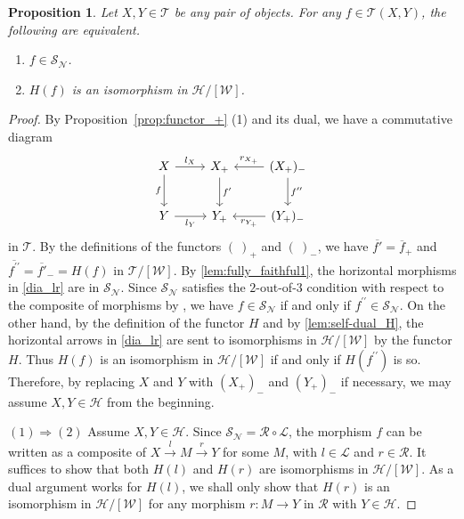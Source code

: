 \documentclass[a4paper,reqno,10pt]{amsart}
\DeclareRobustCommand{\darkblueedit}[1]{#1}
\newtheorem{proposition}[proposition]{Proposition}
\theoremstyle{definition}
\theoremstyle{definition}
\theoremstyle{definition}
\theoremstyle{definition}
\theoremstyle{plain}
\newcommand{\CH}{\mathcal{H}}
\newcommand{\CL}{\mathcal{L}}
\newcommand{\CN}{\mathcal{N}}
\newcommand{\CR}{\mathcal{R}}
\newcommand{\CT}{\mathcal{T}}
\newcommand{\CW}{\mathcal{W}}
\renewcommand{\SS}{\mathscr{S}}
\begin{document}
\begin{proposition}\label{prop:fully_faithful}
Let $X,Y\in\CT$ be any pair of objects. For any $f\in\CT(X,Y)$, the following are equivalent.
\begin{enumerate}
\item $f\in\SS_{\CN}$.
\item $H(f)$ is an isomorphism in $\CH/[\CW]$.
\end{enumerate}
\end{proposition}
\begin{proof}
By Proposition~\ref{prop:functor_+} {\rm (1)} and its dual, we have a commutative diagram
\begin{equation}\label{dia_lr}
\begin{tikzcd}[row sep=0.8cm]
X \arrow{d}[swap]{f}\arrow{r}{l_X}
&X_+ \arrow{d}{f'}
&(X_+)_- \arrow{l}[swap]{r_{X_+}}\arrow{d}{f^{\prime\prime}}
\\
Y \arrow{r}[swap]{l_Y}
&Y_+ 
&(Y_+)_- \arrow{l}{r_{Y_+}}
\end{tikzcd}
\end{equation}
in $\CT$. \darkblueedit{By the definitions of the functors} $(\ )_+$ and $(\ )_-$, we have $\overline{f'}=\overline{f}_+$ and $\overline{f^{\prime\prime}}=\overline{f'}_-=H(f)$ in $\CT/[\CW]$.
By \cref{lem:fully_faithful1}, the horizontal morphisms in \eqref{dia_lr} are in $\SS_{\CN}$.
Since $\SS_{\CN}$ satisfies the $2$-out-of-$3$ condition with respect to the composite of morphisms by \cite[Corollary~2.18]{Oga24}, we have $f\in\SS_{\CN}$ if and only if $f^{\prime\prime}\in\SS_{\CN}$.
On the other hand, by the definition of the functor $H$ and by \cref{lem:self-dual_H}, the horizontal arrows in \eqref{dia_lr} are sent to isomorphisms in $\CH/[\CW]$ by the functor $H$. Thus $H(f)$ is an isomorphism in $\CH/[\CW]$ if and only if $H(f^{\prime\prime})$ is so.
Therefore, by replacing $X$ and $Y$ with $(X_+)_-$ and $(Y_+)_-$ if necessary, we may assume $X,Y\in\CH$ from the beginning.


$(1)\Rightarrow(2)$ 
Assume $X,Y\in\CH$.
\normalcolor
Since $\SS_{\CN}=\CR\circ\CL$, \darkblueedit{the morphism} $f$ can be written as a composite of $X\xrightarrow{l}M\xrightarrow{r}Y$ for some $M$, with $l\in\CL$ and $r\in\CR$. It suffices to show that both $H(l)$ and $H(r)$ are isomorphisms in $\CH/[\CW]$. As a dual argument works for $H(l)$, we shall only show that $H(r)$ is an isomorphism in $\CH/[\CW]$ for any morphism $r\colon M\to Y$ in $\CR$ with $Y\in\CH$.


\end{proof}
\end{document}
